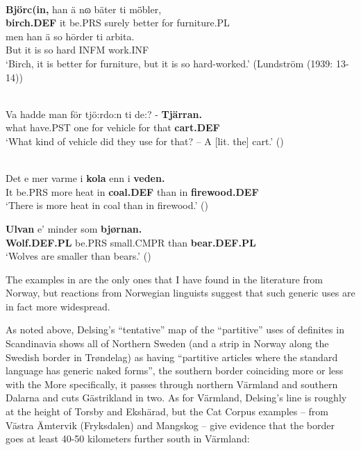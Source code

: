 \z

\ea\label{}
\\
\gll	\textbf{Björc(in,} han  ä  nɷ  bäter  ti  m\={ö}bler,\\
		\textbf{birch.DEF} it  be.PRS  surely  better  for  furniture.PL\\
\gll 	men  han  ä  so  h\=order  ti  arbita.\\
		But  it  is  so  hard  INFM   work.INF\\
\glt	‘Birch, it is better for furniture, but it is so hard-worked.’ (Lundström (1939: 13-14))

\z

\ea\label{}
\\
\gll	Va  hadde  man  för  tjö:rdo:n  ti  de:?  {}-  \textbf{Tjärran.}\\
		what  have.PST  one  for  vehicle  for  that    \textbf{cart.DEF}\\
\glt	‘What kind of vehicle did they use for that? – A [lit. the] cart.’ (\citet[42]{Harling-KranckEtAL1998})

\z

\ea\label{}
\label{bkm:Ref135628619}{}{}\\
	\ea
		\gll	Det  e  mer  varme  i  \textbf{kola} enn  i  \textbf{veden.}\\
				It  be.PRS  more  heat  in  \textbf{coal.DEF} than  in  \textbf{firewood.DEF}\\
		\glt	‘There is more heat in coal than in firewood.’ (\citet[19]{Iversen1918})

	\ex
		\gll	\textbf{Ulvan} e’  minder  som  \textbf{bjørnan.}\\
				\textbf{Wolf.DEF.PL} be.PRS  small.CMPR  than  \textbf{bear.DEF.PL}\\
				
		\glt	‘Wolves are smaller than bears.’ (\citet[18]{Iversen1918})
	\z 
\z

The examples in  are the only ones that I have found in the literature from Norway, but reactions from Norwegian linguists suggest that such generic uses are in fact more widespread. 

As noted above, Delsing’s “tentative” map of the “partitive” uses of definites in Scandinavia shows all of Northern Sweden (and a strip in Norway along the Swedish border in Trøndelag) as having “partitive articles where the standard language has generic naked forms”, the southern border coinciding more or less with the  More specifically, it passes through northern Värmland and southern Dalarna and cuts Gästrikland in two. As for Värmland, Delsing’s line is roughly at the height of Torsby and Ekshärad, but the Cat Corpus examples – from Västra Ämtervik (Fryksdalen) and Mangskog – give evidence that the border goes at least 40-50 kilometers further south in Värmland: 

